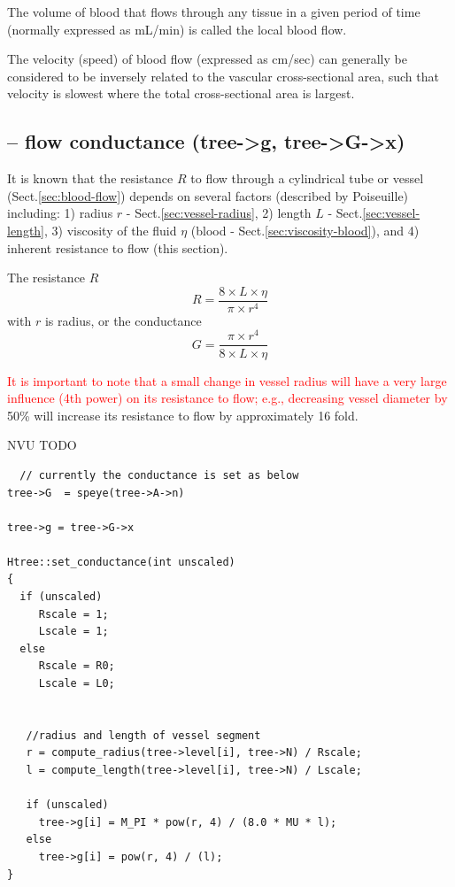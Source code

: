 The volume of blood that flows through any tissue in a given period of time
(normally expressed as mL/min) is called the local blood flow.

The velocity (speed) of blood flow (expressed as cm/sec) can generally be
considered to be inversely related to the vascular cross-sectional area, such
that velocity is slowest where the total cross-sectional area is largest. 

\subsection{-- flow conductance (tree->g, tree->G->x)}
\label{sec:flow-resistance}
\label{sec:flow-conductance}

It is known that the resistance $R$ to flow through a cylindrical tube or vessel
(Sect.\ref{sec:blood-flow}) depends on several factors (described by Poiseuille)
including: 1) radius $r$ - Sect.\ref{sec:vessel-radius}, 2) length $L$ -
Sect.\ref{sec:vessel-length}, 3) viscosity of the fluid $\eta$ (blood -
Sect.\ref{sec:viscosity-blood}), and 4) inherent resistance to flow (this
section). 

The resistance $R$
\begin{equation}
R = \frac{8 \times L \times \eta}{\pi \times r^4}
\end{equation}
with $r$ is radius, or the conductance
\begin{equation}
G = \frac{\pi \times r^4}{8 \times L \times \eta}
\end{equation}


\textcolor{red}{It is important to note that a small change in vessel radius
will have a very large influence (4th power) on its resistance to flow; e.g., decreasing vessel
diameter by} 50\% will increase its resistance to flow by approximately 16 fold.


NVU TODO
\begin{verbatim}
  // currently the conductance is set as below
tree->G  = speye(tree->A->n)

tree->g = tree->G->x

Htree::set_conductance(int unscaled)
{
  if (unscaled)
     Rscale = 1;
     Lscale = 1;
  else
     Rscale = R0;
     Lscale = L0;


   //radius and length of vessel segment
   r = compute_radius(tree->level[i], tree->N) / Rscale;
   l = compute_length(tree->level[i], tree->N) / Lscale;
   
   if (unscaled)
     tree->g[i] = M_PI * pow(r, 4) / (8.0 * MU * l);
   else
     tree->g[i] = pow(r, 4) / (l);
}
\end{verbatim}


